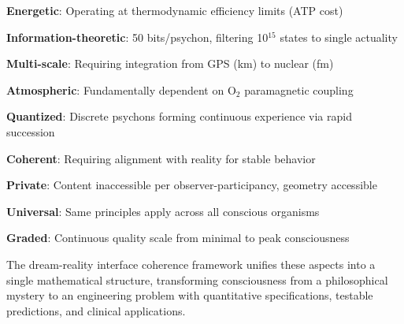 \documentclass[11pt,onecolumn]{article}
\begin{document}
\textbf{Energetic}: Operating at thermodynamic efficiency limits (ATP cost)

\textbf{Information-theoretic}: 50 bits/psychon, filtering 10$^{15}$ states to single actuality

\textbf{Multi-scale}: Requiring integration from GPS (km) to nuclear (fm)

\textbf{Atmospheric}: Fundamentally dependent on O$_2$ paramagnetic coupling

\textbf{Quantized}: Discrete psychons forming continuous experience via rapid succession

\textbf{Coherent}: Requiring alignment with reality for stable behavior

\textbf{Private}: Content inaccessible per observer-participancy, geometry accessible

\textbf{Universal}: Same principles apply across all conscious organisms

\textbf{Graded}: Continuous quality scale from minimal to peak consciousness

The dream-reality interface coherence framework unifies these aspects into a single mathematical structure, transforming consciousness from a philosophical mystery to an engineering problem with quantitative specifications, testable predictions, and clinical applications.



\end{document}
